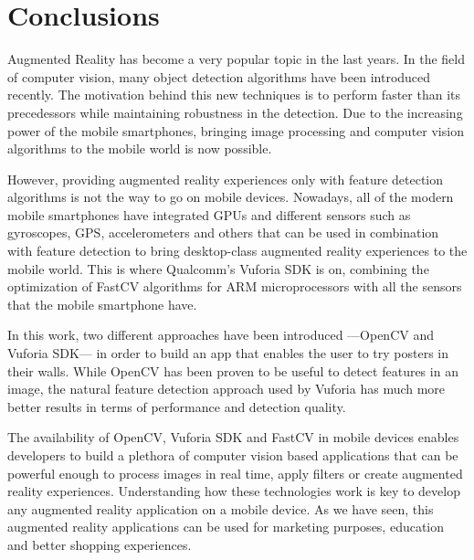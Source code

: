 \chapter{Conclusions}
Augmented Reality has become a very popular topic in the last years. In the field of
computer vision, many object detection algorithms have been introduced recently. The
motivation behind this new techniques is to perform faster than its precedessors
while maintaining robustness in the detection. Due to the increasing power of the
mobile smartphones, bringing image processing and computer vision algorithms to the
mobile world is now possible.

However, providing augmented reality experiences only with feature detection
algorithms is not the way to go on mobile devices. Nowadays, all of the modern
mobile smartphones have integrated GPUs and different sensors such as gyroscopes,
GPS, accelerometers and others that can be used in combination with feature
detection to bring desktop-class augmented reality experiences to the mobile world. 
This is where Qualcomm's Vuforia SDK is on, combining the optimization of
FastCV algorithms for ARM microprocessors with all the sensors that the mobile
smartphone have. 

In this work, two different approaches have been introduced ---OpenCV and
Vuforia SDK--- in order to build an app that enables the user to try posters in
their walls. While OpenCV has been proven to be useful to detect features in an
image, the natural feature detection approach used by Vuforia has much more
better results in terms of performance and detection quality. 

The availability of OpenCV, Vuforia SDK and FastCV in mobile devices enables
developers to build a plethora of computer vision based applications that can be
powerful enough to process images in real time, apply filters or create augmented
reality experiences. Understanding how these technologies work is key to develop any
augmented reality application on a mobile device. As we have seen, this augmented
reality applications can be used for marketing purposes, education and better
shopping experiences.


